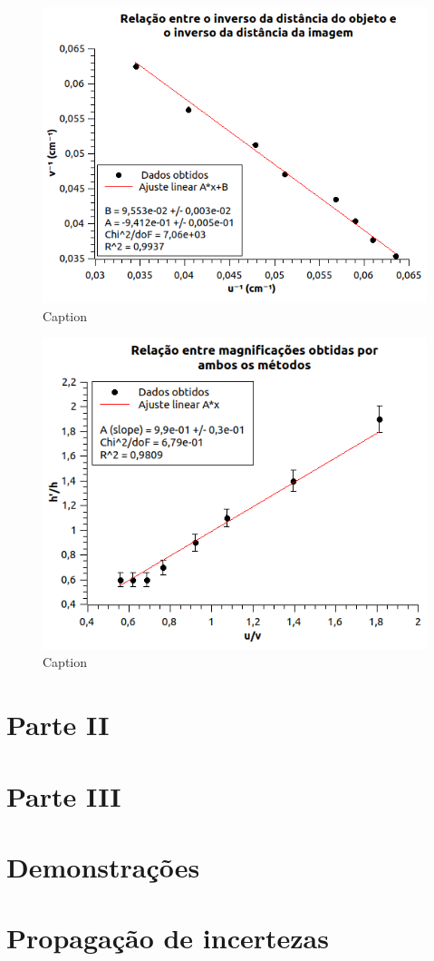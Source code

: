 \documentclass[report,12pt,openright,oneside,a4paper,brazil]{abntex2}
\begin{document}
\begin{figure}[H]
    \centering
    \includegraphics[scale=0.7]{Figuras/distObjIm.png}
    \caption{Caption}
    \label{fig:my_label}
\end{figure}

\begin{figure}[H]
    \centering
    \includegraphics[scale=0.7]{Figuras/magni.png}
    \caption{Caption}
    \label{fig:my_label2}
\end{figure}

\chapter{Parte II}

\chapter{Parte III}

\newpage
\appendix

\newpage



\nocite{*}

\chapter{Demonstrações}

\chapter{Propagação de incertezas}
\end{document}
